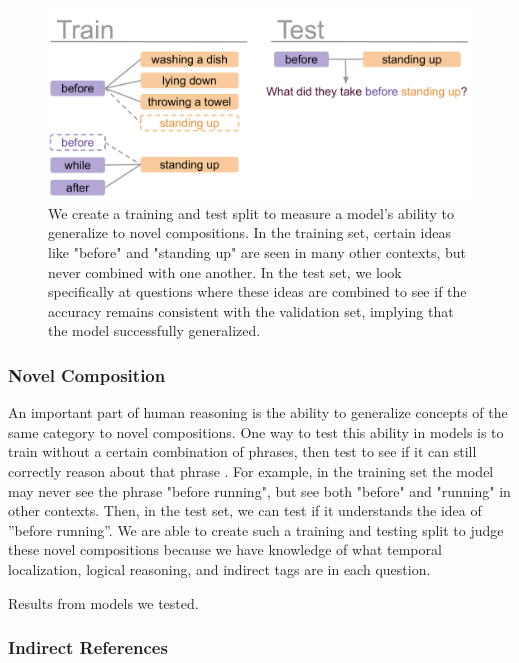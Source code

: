 \documentclass[10pt,twocolumn,letterpaper]{article}
\begin{document}
\begin{figure}[t]
    \centering
    \includegraphics[width=0.95\linewidth]{figures/novel comp.pdf}
    \caption{We create a training and test split to measure a model's ability to generalize to novel compositions. In the training set, certain ideas like "before" and "standing up" are seen in many other contexts, but never combined with one another. In the test set, we look specifically at questions where these ideas are combined to see if the accuracy remains consistent with the validation set, implying that the model successfully generalized.}
    \label{fig:compo}
\end{figure}


\subsubsection{Novel Composition}

An important part of human reasoning is the ability to generalize concepts of the same category to novel compositions. One way to test this ability in models is to train without a certain combination of phrases, then test to see if it can still correctly reason about that phrase \cite{lake2018generalization}. For example, in the training set the model may never see the phrase "before running", but see both "before" and "running" in other contexts. Then, in the test set, we can test if it understands the  idea  of  ”before running”.   We are able to create such a training and testing split to judge these  novel  compositions  because  we  have  knowledge  of what temporal localization, logical reasoning, and indirect tags are in each question.

Results from models we tested.

\subsubsection{Indirect References}
\end{document}
